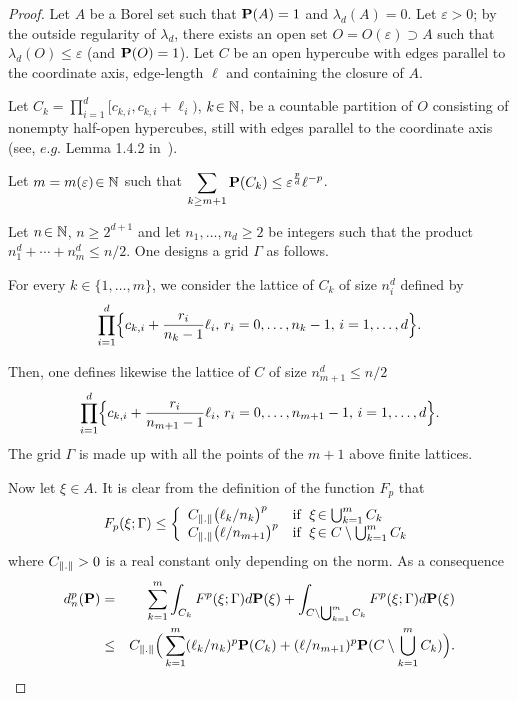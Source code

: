 \begin{proof} 
Let $A$  be a Borel set such that $\mathbf{P}(A)=1$
and $\lambda_d(A)=0$. Let $\varepsilon>0$; by the outside regularity of
$\lambda_d$, there exists an open set $O=O(\varepsilon)\supset  A$ such that
$\lambda_d(O)\le \varepsilon$ (and $\mathbf{P}(O)=1$). Let $C$ be an open hypercube with
edges parallel to the coordinate axis, edge-length $\ell$ and  containing the closure of
$A$.

Let $C_k= \prod_{i=1}^d [c_{k,i}, c_{k,i}+\ell_i)$, $k\!\in \mathbb{N}$, be a countable
partition of $O$ consisting of nonempty half-open hypercubes, still with edges
parallel to the coordinate axis (see,  $e.g.$ Lemma 1.4.2 in~\cite{COH}).


Let $m=m(\varepsilon)\!\in \mathbb{N}$ such that $\displaystyle \sum_{k\ge m+1}\mathbf{P}(C_k)\le
\varepsilon^{\frac pd} \ell^{-p}$.

Let $n\!\in \mathbb{N}$, $n\ge 2^{d+1}$ and let $n_1, \ldots, n_d\ge 2$ be integers such
that the product $n^d_1 + \cdots + n_m^d \le n/2$. One designs a grid $\Gamma$
as follows.

For every $k\!\in \{1,\ldots,m\}$, we consider the lattice of $C_k$ of size $n_i
^d$ defined by 
\[ 
\displaystyle\prod_{i=1}^d \Bigl\{c_{k,i}+ \frac{r_i}{n_k-1}\ell_i,\,
r_i=0,\ldots, n_k-1,\, i=1,\ldots, d\Bigr\}. 
\]

Then, one defines likewise the lattice of $C$ of size $n_{m+1}^d \le n/2$ 
\[
\displaystyle\prod_{i=1}^d \Bigl\{c_{k,i}+ \frac{r_i}{n_{m+1}-1}\ell_i,\, r_i=0,\ldots,
n_{m+1}-1,\, i=1,\ldots,d\Bigr\}. 
\] 
The grid $\Gamma$ is made up with all the points
of the $m+1$ above finite lattices.

Now let $\xi \!\in A$. It is clear from the definition of the function $F_p$
that 
\[ F_p(\xi; \Gamma) \le \left\{\begin{array}{ll}
C_{\lVert.\rVert} \big(\ell_k/n_k\big)^p& \mbox{if } \; \xi \!\in \bigcup_{k=1}^mC_k \\
C_{\lVert.\rVert} \big(\ell/n_{m+1}\big)^p& \mbox{if } \; \xi \!\in C \setminus 
\bigcup_{k=1}^mC_k        \end{array}\right. 
\] where $C_{\lVert.\rVert} >0$ is a
real constant only depending on the norm. As a consequence
\begin{eqnarray*}
d_{n}^p(\mathbf{P})&=& \sum_{k=1}^m \int_{C_k}F^p(\xi;\Gamma)d\mathbf{P}(\xi) +\int_{C \setminus  \bigcup_{k=1}^mC_k } F^p(\xi; \Gamma)d\mathbf{P}(\xi)\\
&\le& C_{\lVert.\rVert}  \Big( \sum_{k=1}^m (\ell_k/n_k)^p\mathbf{P}(C_k) + (\ell/n_{m+1})^p\mathbf{P} (C \setminus  \bigcup_{k=1}^mC_k )\Big).
\end{eqnarray*}


\end{proof}
